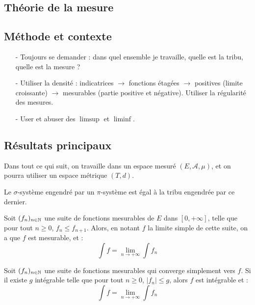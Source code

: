 \documentclass[11pt,a4paper]{article}
\begin{document}
\newpage
\begin{center}
\section*{Théorie de la mesure} 
\end{center}


\subsection*{Méthode et contexte}

\begin{itemize}
\item[-] Toujours se demander : dans quel ensemble je travaille, quelle est la tribu, quelle est la mesure ? 
\item[-] Utiliser la densité : indicatrices $\rightarrow$ fonctions étagées $\rightarrow$ positives (limite croissante) $\rightarrow$ mesurables (partie positive et négative). Utiliser la régularité des mesures.
\item[-] User et abuser des $\limsup$ et $\liminf$.
\end{itemize}

\subsection*{Résultats principaux}
Dans tout ce qui suit, on travaille dans un espace mesuré $(E,\mathcal{A},\mu)$, et on pourra utiliser un espace métrique $(T,d)$.


\begin{thmstar}[Dynkin] 
Le $\sigma$-système engendré par un $\pi$-système est égal à la tribu engendrée par ce dernier.
\end{thmstar}


\begin{thmstar}
Soit $(f_n)_{n\in\mathbb N}$ une suite de fonctions mesurables de $E$ dans $[0,+\infty]$, telle que pour tout $n\geq 0$, $f_n \leq f_{n+1}  $. Alors, en notant $f$ la limite simple de cette suite, on a que $f$ est mesurable, et : 
\[\int f = \lim\limits_{n \to +\infty} \int f_n \]
\end{thmstar}


\begin{thmstar}
Soit $(f_n)_{n\in\mathbb N}$ une suite de fonctions mesurables qui converge simplement vers $f$. Si il existe $g$ intégrable telle que pour tout $n \geq 0$, $\left| f_n \right| \leq g$, alors $f$ est intégrable et :
\[\int f = \lim\limits_{n \to +\infty} \int f_n \]
\end{thmstar}
\end{document}
